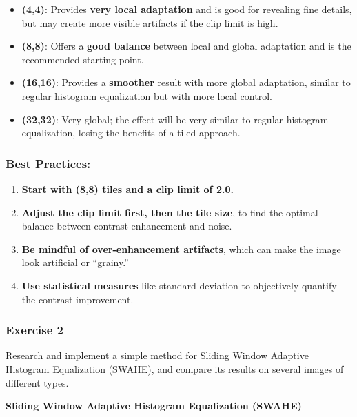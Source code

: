 \documentclass[11pt]{article}
\providecommand{\tightlist}{%
      \setlength{\itemsep}{0pt}\setlength{\parskip}{0pt}}
\begin{document}
\begin{itemize}
\tightlist
\item
  \textbf{(4,4)}: Provides \textbf{very local adaptation} and is good
  for revealing fine details, but may create more visible artifacts if
  the clip limit is high.
\item
  \textbf{(8,8)}: Offers a \textbf{good balance} between local and
  global adaptation and is the recommended starting point.
\item
  \textbf{(16,16)}: Provides a \textbf{smoother} result with more global
  adaptation, similar to regular histogram equalization but with more
  local control.
\item
  \textbf{(32,32)}: Very global; the effect will be very similar to
  regular histogram equalization, losing the benefits of a tiled
  approach.
\end{itemize}

\hypertarget{best-practices}{%
\subsubsection{Best Practices:}\label{best-practices}}

\begin{enumerate}
\def\labelenumi{\arabic{enumi}.}
\tightlist
\item
  \textbf{Start with (8,8) tiles and a clip limit of 2.0.}
\item
  \textbf{Adjust the clip limit first, then the tile size}, to find the
  optimal balance between contrast enhancement and noise.
\item
  \textbf{Be mindful of over-enhancement artifacts}, which can make the
  image look artificial or ``grainy.''
\item
  \textbf{Use statistical measures} like standard deviation to
  objectively quantify the contrast improvement.
\end{enumerate}

    \hypertarget{exercise-2}{%
\subsubsection{Exercise 2}\label{exercise-2}}

Research and implement a simple method for Sliding Window Adaptive
Histogram Equalization (SWAHE), and compare its results on several
images of different types.

\textbf{Sliding Window Adaptive Histogram Equalization (SWAHE)} 
\end{document}
